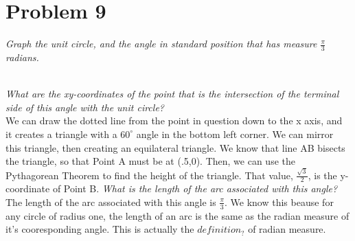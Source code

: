 \documentclass[11pt]{article} %
\newcommand\tab[1][1cm]{\hspace*{#1}}
\begin{document}
\section{Problem 9}
\textit{Graph the unit circle, and the angle in standard position that has measure $\frac{\pi}{3}$ radians.} \\
\\
\textit{What are the xy-coordinates of the point that is the intersection of the terminal side of this angle with the unit circle?} \\
\tab We can draw the dotted line from the point in question down to the x axis, and it creates a triangle with a $60^{\circ}$  angle in the bottom left corner. 
We can mirror this triangle, then creating an equilateral triangle. 
We know that line AB bisects the triangle, so that Point A must be at (.5,0). 
Then, we can use the Pythagorean Theorem to find the height of the triangle. 
That value, $\frac{\sqrt{3}}{2}$, is the y-coordinate of Point B.
\textit{What is the length of the arc associated with this angle?} \\
\tab The length of the arc associated with this angle is $\frac{\pi}{3}$. We know this beause for any circle of radius one, the length of an arc is the same as the radian measure of it's cooresponding angle. 
This is actually the $definition_?$ of radian measure.
\end{document}
